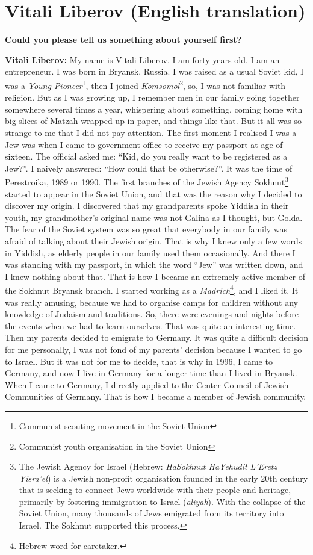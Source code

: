 \section{Vitali Liberov (English translation)}

\textbf{Could you please tell us something about yourself first?} 

\textbf{Vitali Liberov:} My name is Vitali Liberov. I am forty years old. I am an entrepreneur. I was born in Bryansk, Russia. I was raised as a usual Soviet kid, I was a \textit{Young Pioneer}\footnote{Communist scouting movement in the Soviet Union}, then I joined \textit{Komsomol}\footnote{Communist youth organisation in the Soviet Union}, so, I was not familiar with religion. But as I was growing up, I remember men in our family going together somewhere several times a year, whispering about something, coming home with big slices of Matzah wrapped up in paper, and things like that. But it all was so strange to me that I did not pay attention. The first moment I realised I was a Jew was when I came to government office to receive my passport at age of sixteen. The official asked me: “Kid, do you really want to be registered as a Jew?”. I naively answered: “How could that be otherwise?”. It was the time of Perestroika, 1989 or 1990. The first branches of the Jewish Agency Sokhnut\footnote{The Jewish Agency for Israel (Hebrew: \textit{HaSokhnut HaYehudit L'Eretz Yisra'el}) is a Jewish non-profit organisation founded in the early 20th century that is seeking to connect Jews worldwide with their people and heritage, primarily by fostering immigration to Israel (\textit{aliyah}). With the collapse of the Soviet Union, many thousands of Jews emigrated from its territory into Israel. The Sokhnut supported this process.} started to appear in the Soviet Union, and that was the reason why I decided to discover my origin. I discovered that my grandparents spoke Yiddish in their youth, my grandmother’s original name was not Galina as I thought, but Golda. The fear of the Soviet system was so great that everybody in our family was afraid of talking about their Jewish origin. That is why I knew only a few words in Yiddish, as elderly people in our family used them occasionally. And there I was standing with my passport, in which the word “Jew” was written down, and I knew nothing about that. That is how I became an extremely active member of the Sokhnut Bryansk branch. I started working as a \textit{Madrich}\footnote{Hebrew word for caretaker.}, and I liked it.  It was really amusing, because we had to organise camps for children without any knowledge of Judaism and traditions. So, there were evenings and nights before the events when we had to learn ourselves. That was quite an interesting time. Then my parents decided to emigrate to Germany. It was quite a difficult decision for me personally, I was not fond of my parents’ decision because I wanted to go to Israel. But it was not for me to decide, that is why in 1996, I came to Germany, and now I live in Germany for a longer time than I lived in Bryansk. When I came to Germany, I directly applied to the Center Council of Jewish Communities of Germany. That is how I became a member of Jewish community.  

